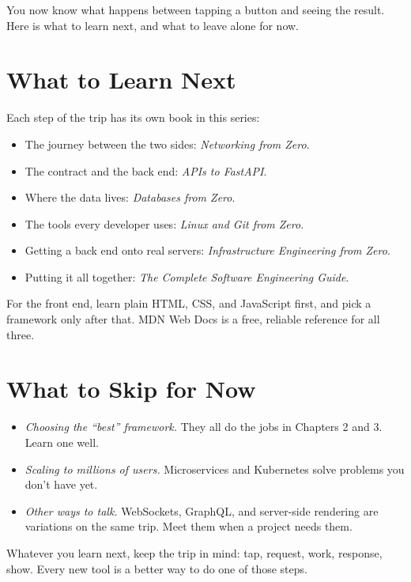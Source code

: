 
\begin{chapterintro}

You now know what happens between tapping a button and seeing the result. Here is what to learn next, and what to leave alone for now.

\end{chapterintro}

\section{What to Learn Next}\label{06-where-to-go-from-here:what-to-learn-next}

Each step of the trip has its own book in this series:

\begin{itemize}
\tightlist
\item
  The journey between the two sides: \emph{Networking from Zero}.
\item
  The contract and the back end: \emph{APIs to FastAPI}.
\item
  Where the data lives: \emph{Databases from Zero}.
\item
  The tools every developer uses: \emph{Linux and Git from Zero}.
\item
  Getting a back end onto real servers: \emph{Infrastructure Engineering from Zero}.
\item
  Putting it all together: \emph{The Complete Software Engineering Guide}.
\end{itemize}

For the front end, learn plain HTML, CSS, and JavaScript first, and pick a framework only after that. MDN Web Docs is a free, reliable reference for all three.

\section{What to Skip for Now}\label{06-where-to-go-from-here:what-to-skip-for-now}

\begin{itemize}
\tightlist
\item
  \emph{Choosing the ``best'' framework.} They all do the jobs in Chapters 2 and 3. Learn one well.
\item
  \emph{Scaling to millions of users.} Microservices and Kubernetes solve problems you don't have yet.
\item
  \emph{Other ways to talk.} WebSockets, GraphQL, and server-side rendering are variations on the same trip. Meet them when a project needs them.
\end{itemize}

Whatever you learn next, keep the trip in mind: tap, request, work, response, show. Every new tool is a better way to do one of those steps.
